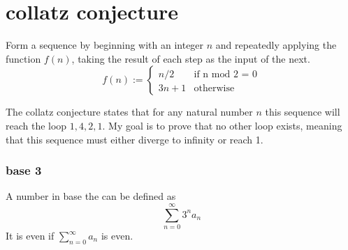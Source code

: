 \documentclass[12pt]{extreport}
\begin{document}
\chapter{collatz conjecture}

Form a sequence by beginning with an integer $n$ and repeatedly applying the function $f(n)$,
taking the result of each step as the input of the next.
$$
f(n) := 
\begin{cases}
    n / 2 & \text{if n mod 2 = 0} \\
    3n + 1 & \text{otherwise}
\end{cases}
$$

The collatz conjecture states that for any natural number $n$ this
sequence will reach the loop $1, 4, 2, 1$. My goal is to prove that no other loop exists,
meaning that this sequence must either diverge to infinity or reach 1.

\subsection{base 3}

A number in base the can be defined as
$$
\sum^\infty_{n=0} 3^na_n
$$
It is even if $\sum^\infty_{n=0}a_n$ is even. 
\end{document}
